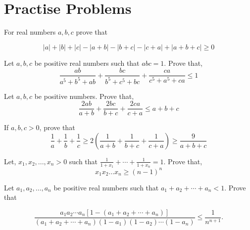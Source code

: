  
 
 
 
 
 
\section{Practise Problems}
\begin{problem}
    For real numbers $a,b,c$ prove that

\[| a | + | b | + | c | − | a + b | − | b + c | − | c + a | + | a + b + c | \ge 0 \]
\begin{hint}
\addhint{}
\addhint{}
\end{hint}
\end{problem}

\begin{problem}[IMO SL-1996]
     Let $a,b,c$ be positive real numbers such that $abc=1$. Prove that,
     \[\frac{ab}{a^5 +b^5 +ab}+  \frac{bc}{b^5+c^5 +bc} + \frac{ca}{c^5 +a^5 +ca} \le 1\]
     \begin{hint}
     \addhint{}
     \addhint{}
     \end{hint}
\end{problem}


\begin{problem}
     Let $a,b,c$ be positive numbers. Prove that,
     \[\frac{2ab}{a+b}+\frac{2bc}{b+c} +\frac {2ca}{c+a}\le a+b+c \]
     \begin{hint}
     \addhint{}
     \addhint{}
     \end{hint}
\end{problem}


\begin{problem}
     If $a, b, c > 0$, prove that
     \[ \frac{1}{a}+ \frac{1}{b}+ \frac{1}{c}\ge 2 \left(\frac{1}{a+b} + \frac{1}{b+c}+ \frac{1}{c+a} \right) \ge \frac{9}{a+b+c} \]
     \begin{hint}
\addhint{}
\end{hint}
\end{problem}


\begin{problem}
     Let, $x_{1}, x_2, ..., x_n > 0 $ such that $\frac{1}{1+x_{1}}+ \cdots +\frac{1}{1+ x_{n}}=1$. Prove that, 
     \[ x_{1}x_{2}...x_{n} \ge (n − 1)^n \]
     \begin{hint}
     \addhint{}
     \addhint{}
     \end{hint}
\end{problem}

\begin{problem}[IMO SL, 1998]
Let $a_{1},a_{2},\ldots ,a_{n}$ be positive real numbers such that $a_{1}+a_{2}+\cdots +a_{n}<1$. Prove that

\[ \frac{a_{1} a_{2} \cdots a_{n} \left[ 1 - (a_{1} + a_{2} + \cdots + a_{n}) \right] }{(a_{1} + a_{2} + \cdots + a_{n})( 1 - a_{1})(1 - a_{2}) \cdots (1 - a_{n})} \leq \frac{1}{ n^{n+1}}. \]

    \begin{hint}
        \addhint{}
        \addhint{}
    \end{hint}

     
\end{problem}


